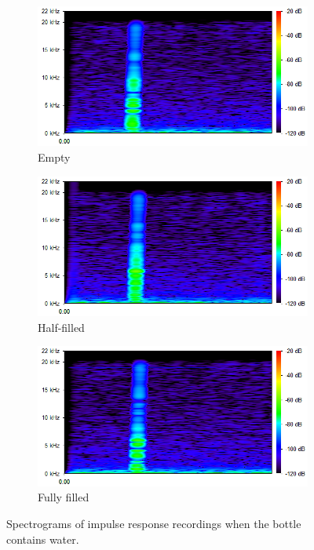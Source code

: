 \documentclass{article} %
\begin{document}
\begin{figure}[htb]
\centering
\begin{subfigure}{0.32\linewidth}
  \includegraphics[width=\linewidth]{water_empty.png}
  \caption*{Empty}
\end{subfigure}
\begin{subfigure}{0.32\linewidth}
  \includegraphics[width=\linewidth]{water_half.png}
  \caption*{Half-filled}
\end{subfigure}
\begin{subfigure}{0.32\linewidth}
  \includegraphics[width=\linewidth]{water_full.png}
  \caption*{Fully filled}
\end{subfigure}
  \caption{Spectrograms of impulse response recordings when the bottle contains water.}
  \label{fig:set-up}
\end{figure}
\end{document}
